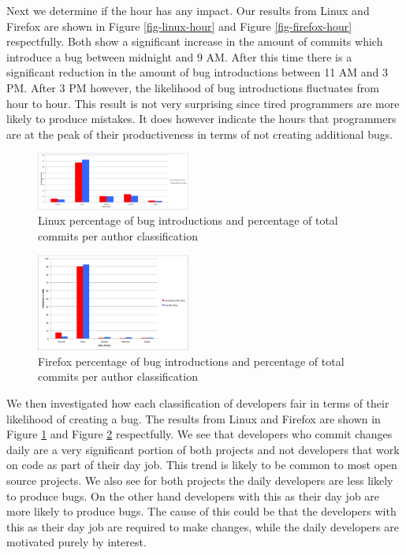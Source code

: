 Next we determine if the hour has any impact. Our results from Linux
and Firefox are shown in Figure \ref{fig-linux-hour} and Figure
\ref{fig-firefox-hour} respectfully. Both show a significant increase
in the amount of commits which introduce a bug between midnight and 9
AM. After this time there is a significant reduction in the amount of
bug introductions between 11 AM and 3 PM. After 3 PM however, the
likelihood of bug introductions fluctuates from hour to hour. This
result is not very surprising since tired programmers are more likely to
produce mistakes. It does however indicate the hours that programmers
are at the peak of their productiveness in terms of not creating
additional bugs.

\begin{figure}
\begin{center}
\includegraphics[width=0.45\textwidth]{linux_per_class.png}
\end{center}
\caption{Linux percentage of bug introductions and percentage of total commits per author classification}
\label{fig-linux-class}
\end{figure}

\begin{figure}
\begin{center}
\includegraphics[width=0.45\textwidth]{firefox_per_class.png}
\end{center}
\caption{Firefox percentage of bug introductions and percentage of total commits per author classification}
\label{fig-firefox-class}
\end{figure}

We then investigated how each classification of developers fair in
terms of their likelihood of creating a bug. The results from Linux
and Firefox are shown in Figure \ref{fig-linux-class} and Figure
\ref{fig-firefox-class} respectfully. We see that developers who
commit changes daily are a very significant portion of both projects
and not developers that work on code as part of their day job. This
trend is likely to be common to most open source projects. We also see
for both projects the daily developers are less likely to produce
bugs. On the other hand developers with this as their day job are more
likely to produce bugs. The cause of this could be that the developers
with this as their day job are required to make changes, while the
daily developers are motivated purely by interest.

